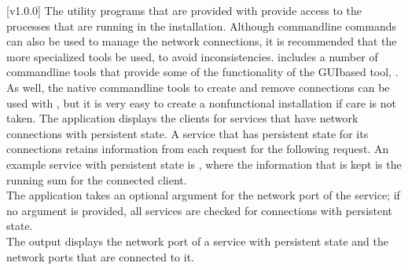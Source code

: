[v1.0.0]
The utility programs that are provided with \mplusm{} provide access to the processes that
are running in the \mplusm{} installation.
Although command\longDash{}line \yarp{} commands can also be used to manage the network
connections, it is recommended that the more specialized \mplusm{} tools be used, to avoid
inconsistencies.
\mplusm{} includes a number of command\longDash{}line tools that provide some of the
functionality of the GUI\longDash{}based tool, \emph{\MMMU}.
As well, the native \yarp{} command\longDash{}line tools to create and remove connections
can be used with \mplusm, but it is very easy to create a non\longDash{}functional
installation if care is not taken.
The application  displays the clients for services that have
\yarp{} network connections with persistent state.
A service that has persistent state for its connections retains information from each
request for the following request.
An example service with persistent state is
, where the information that is kept is the
running sum for the connected client.\\

The application takes an optional argument for the \yarp{} network port of the service;
if no argument is provided, all services are checked for connections with persistent
state.
\insertFullUtilityParameters\\

The output displays the \yarp{} network port of a service with persistent state and the
\yarp{} network ports that are connected to it.\\

